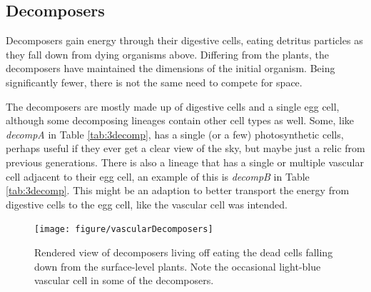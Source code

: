 \subsection{Decomposers}
Decomposers gain energy through their digestive cells, eating detritus particles as they fall down from dying organisms above. Differing from the plants, the decomposers have maintained the dimensions of the initial organism. Being significantly fewer, there is not the same need to compete for space.

The decomposers are mostly made up of digestive cells and a single egg cell, although some decomposing lineages contain other cell types as well. Some, like \emph{decompA} in Table \ref{tab:3decomp}, has a single (or a few) photosynthetic cells, perhaps useful if they ever get a clear view of the sky, but maybe just a relic from previous generations. There is also a lineage that has a single or multiple vascular cell adjacent to their egg cell, an example of this is \emph{decompB} in Table \ref{tab:3decomp}. This might be an adaption to better transport the energy from digestive cells to the egg cell, like the vascular cell was intended.

\begin{figure}
  \begin{center}
  \texttt{[image: figure/vascularDecomposers]}
  \caption{Rendered view of decomposers living off eating the dead cells falling down from the surface-level plants. Note the occasional light-blue vascular cell in some of the decomposers.}
  \label{fig:vascularDecomposers}
  \end{center}
\end{figure}

